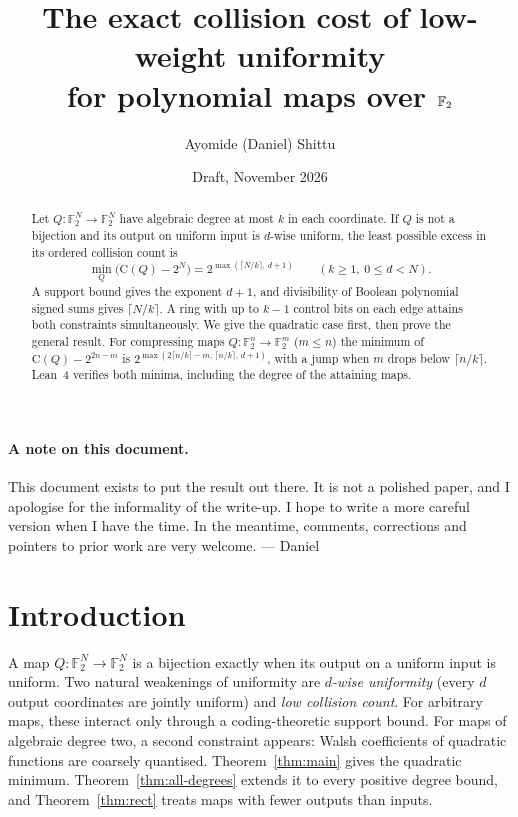 \documentclass[11pt]{article}
\title{The exact collision cost of low-weight uniformity\\ for polynomial maps over $\F$}
\author{Ayomide (Daniel) Shittu}
\date{Draft, November 2026}
\theoremstyle{definition}
\theoremstyle{remark}
\newcommand{\F}{\mathbb{F}_2}
\newcommand{\Coll}{\mathrm{C}}
\begin{document}
\maketitle

\begin{abstract}
Let $Q\colon\F^N\to\F^N$ have algebraic degree at most $k$ in each
coordinate. If $Q$ is not a bijection and its output on uniform input is
$d$-wise uniform, the least possible excess in its ordered collision count is
\[
  \min_Q\bigl(\Coll(Q)-2^N\bigr)
    =2^{\max(\lceil N/k\rceil,\,d+1)}
    \qquad(k\ge1,\ 0\le d<N).
\]
A support bound gives the exponent $d+1$, and divisibility of Boolean
polynomial signed sums gives $\lceil N/k\rceil$. A ring with up to $k-1$
control bits on each edge attains both constraints simultaneously. We give
the quadratic case first, then prove the general result. For compressing
maps $Q\colon\F^n\to\F^m$ ($m\le n$) the minimum of $\Coll(Q)-2^{2n-m}$ is
$2^{\max(2\lceil n/k\rceil-m,\,\lceil n/k\rceil,\,d+1)}$, with a jump when $m$
drops below $\lceil n/k\rceil$. Lean~4 verifies both minima, including the
degree of the attaining maps.
\end{abstract}

\paragraph{A note on this document.}
This document exists to put the result out there. It is not a polished paper,
and I apologise for the informality of the write-up. I hope to write a more
careful version when I have the time. In the meantime, comments, corrections
and pointers to prior work are very welcome.
\hfill --- Daniel

\section{Introduction}

A map $Q\colon\F^N\to\F^N$ is a bijection exactly when its output on a uniform
input is uniform. Two natural weakenings of uniformity are \emph{$d$-wise
uniformity} (every $d$ output coordinates are jointly uniform) and \emph{low
collision count}. For arbitrary maps, these interact only through a
coding-theoretic support bound. For maps of algebraic degree two, a second
constraint appears: Walsh coefficients of quadratic functions are coarsely
quantised. Theorem~\ref{thm:main} gives the quadratic minimum. Theorem~\ref{thm:all-degrees} extends it to every positive degree bound, and Theorem~\ref{thm:rect} treats maps with fewer outputs than inputs.
\end{document}
